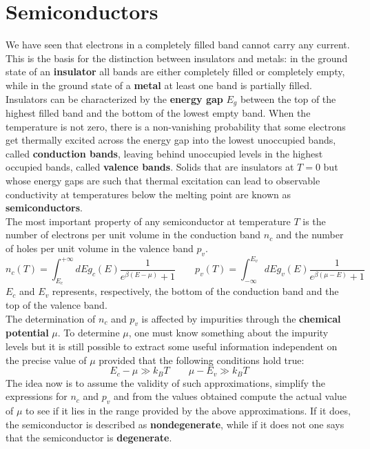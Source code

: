 \documentclass[10.75pt,a4paper,openright,bottom=2cm]{article}
\begin{document}
\section{Semiconductors}
We have seen that electrons in a completely filled band cannot carry any current. This is the basis for the distinction between insulators and metals: in the ground state of an \textbf{insulator} all bands are either completely filled or completely empty, while in the ground state of a \textbf{metal} at least one band is partially filled. Insulators can be characterized by the \textbf{energy gap} $E_g$ between the top of the highest filled band and the bottom of the lowest empty band. When the temperature is not zero, there is a non-vanishing probability that some electrons get thermally excited across the energy gap into the lowest unoccupied bands, called \textbf{conduction bands}, leaving behind unoccupied levels in the highest occupied bands, called \textbf{valence bands}. Solids that are insulators at $T=0$ but whose energy gaps are such that thermal excitation can lead to observable conductivity at temperatures below the melting point are known as \textbf{semiconductors}.\\
The most important property of any semiconductor at temperature $T$ is the number of electrons per unit volume in the conduction band $n_c$ and the number of holes per unit volume in the valence band $p_v$.
\[
n_c(T)=\int_{E_c}^{+\infty} dEg_c(E)\frac{1}{e^{\beta(E-\mu)}+1} \qquad p_v(T)=\int_{-\infty}^{E_v}dEg_v(E)\frac{1}{e^{\beta(\mu-E)}+1}
\]
$E_c$ and $E_v$ represents, respectively, the bottom of the conduction band and the top of the valence band.\\
The determination of $n_c$ and $p_v$ is affected by impurities through the \textbf{chemical potential} $\mu$. To determine $\mu$, one must know something about the impurity levels but it is still possible to extract some useful information independent on the precise value of $\mu$ provided that the following conditions hold true:
\begin{equation}
\label{nondeg}
E_c-\mu\gg k_BT \qquad \mu-E_v\gg k_BT
\end{equation}
The idea now is to assume the validity of such approximations, simplify the expressions for $n_c$ and $p_v$ and from the values obtained compute the actual value of $\mu$ to see if it lies in the range provided by the above approximations. If it does, the semiconductor is described as \textbf{nondegenerate}, while if it does not one says that the semiconductor is \textbf{degenerate}.\\
\end{document}
